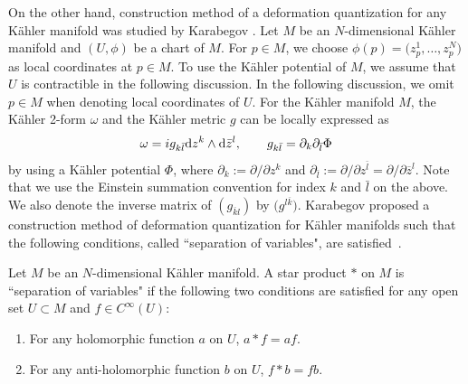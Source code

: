 \documentclass[pdftex]{sigma}
\numberwithin{equation}{section}
\begin{document}
On the other hand, construction method of a deformation quantization for any K\"ahler manifold was studied by Karabegov \cite{Kara2,Kara1}. Let $M$ be an $N$-dimensional K\"ahler manifold and
$(U,\phi)$ be a chart of $M$. For
$
p
\in
M
$, we choose
$
\phi(p)
=
 \bigl(z^{1}_{p},\dots,z^{N}_{p} \bigr)
$
as local coordinates at
$
p
\in
M
$.
To use the K\"ahler potential of $M$, we assume that $U$ is contractible in the following discussion. In the following discussion, we omit
$
p
\in
M
$
when denoting local coordinates of $U$. For the K\"ahler manifold $M$, the K\"ahler 2-form $\omega$ and the K\"ahler metric $g$ can be locally expressed as
\begin{align*}
 \omega
 =
 i
 g_{k\bar{l}}
 {\rm d}z^{k}
 \wedge
 {\rm d}\bar{z}^{l},
 \qquad
 g_{k\bar{l}}
 =
 \partial_{k}
 \partial_{\bar{l}}
 \Phi
\end{align*}
by using a K\"ahler potential $\Phi$, where
$
\partial_{k}
:=
\partial/
\partial
z^{k}
$
and
$
\partial_{\bar{l}}
:=
\partial/
\partial
z^{\bar{l}}
=
\partial/
\partial
\overline{z}^{l}
$.
Note that we use the Einstein summation convention for index $k$ and $\bar{l}$ on the above.
We also denote the inverse matrix of $ (g_{\overline{k}l} )$ by $ \bigl(g^{l\overline{k}} \bigr)$.
Karabegov proposed a construction method of deformation quantization for K\"ahler manifolds such that the following conditions, called ``separation of variables", are satisfied~\cite{Kara2,Kara1}.
\begin{Definition} \label{sep_of_bar_starprd}
 Let $M$ be an $N$-dimensional K\"ahler manifold. A star product $\ast$ on $M$ is ``separation of variables" if the following two conditions are satisfied for any open set $
 U
 \subset
 M
 $
 and
 $
 f
 \in
 C^{\infty}
 (
 U
 )
 $:
 \begin{enumerate}\itemsep=0pt
 \item[(1)]
 For any holomorphic function
 $ a $
 on $U$,
 $ a
 \ast
 f
 =
 af $.
 \item[(2)]
 For any anti-holomorphic function
 $ b $
 on $U$,
 $
 f
 \ast
 b
 =
 fb
 $.
 \end{enumerate}
\end{Definition}
\end{document}
